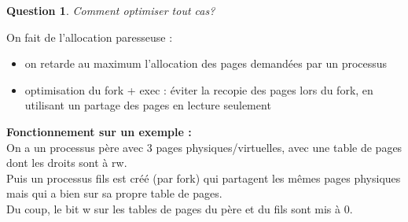 \documentclass[12pt,a4paper]{report}
\newtheorem*{q}{Question}
\begin{document}
\begin{q}Comment optimiser tout cas?\end{q}

On fait de l'allocation paresseuse :
\begin{itemize}
\item[\textbf{1$^e$ cas :}] on retarde au maximum l'allocation des pages demandées par un processus
\item[\textbf{2$^e$ cas :}] optimisation du fork + exec : éviter la recopie des pages lors du fork, en utilisant un partage des pages en lecture seulement\\ 
\end{itemize}
\medskip

\textbf{Fonctionnement sur un exemple :}\\
On a un processus père avec 3 pages physiques/virtuelles, avec une table de pages dont les droits sont à rw.\\
Puis un processus fils est créé (par fork) qui partagent les mêmes pages physiques mais qui a bien sur sa propre table de pages.\\
Du coup, le bit w sur les tables de pages du père et du fils sont mis à 0.\\
\end{document}

